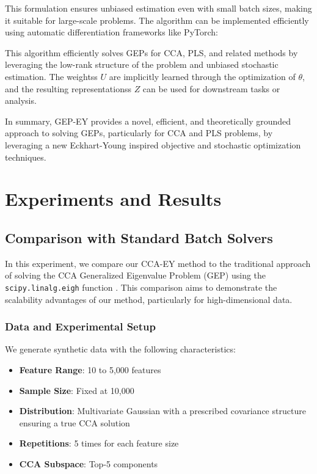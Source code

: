 This formulation ensures unbiased estimation even with small batch sizes, making it suitable for large-scale problems. The algorithm can be implemented efficiently using automatic differentiation frameworks like PyTorch:

This algorithm efficiently solves GEPs for CCA, PLS, and related methods by leveraging the low-rank structure of the problem and unbiased stochastic estimation. The \glspl{weights} $U$ are implicitly learned through the optimization of $\theta$, and the resulting \glspl{representations} $Z$ can be used for downstream tasks or analysis.

In summary, GEP-EY provides a novel, efficient, and theoretically grounded approach to solving GEPs, particularly for CCA and PLS problems, by leveraging a new Eckhart-Young inspired objective and stochastic optimization techniques.

\section{Experiments and Results}\label{sec:experiments}
\subsection{Comparison with Standard Batch Solvers}
In this experiment, we compare our CCA-EY method to the traditional approach of solving the CCA Generalized Eigenvalue Problem (GEP) using the \texttt{scipy.linalg.eigh} function \citep{virtanen2020scipy}. This comparison aims to demonstrate the scalability advantages of our method, particularly for high-dimensional data.

\subsubsection{Data and Experimental Setup}
We generate synthetic data with the following characteristics:
\begin{itemize}
    \item \textbf{Feature Range}: 10 to 5,000 features
    \item \textbf{Sample Size}: Fixed at 10,000
    \item \textbf{Distribution}: Multivariate Gaussian with a prescribed covariance structure ensuring a true CCA solution
    \item \textbf{Repetitions}: 5 times for each feature size
    \item \textbf{CCA Subspace}: Top-5 components
\end{itemize}

